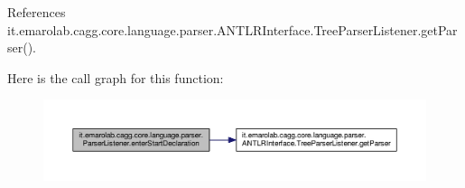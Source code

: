 References it.\-emarolab.\-cagg.\-core.\-language.\-parser.\-A\-N\-T\-L\-R\-Interface.\-Tree\-Parser\-Listener.\-get\-Parser().



Here is the call graph for this function\-:\nopagebreak
\begin{figure}[H]
\begin{center}
\leavevmode
\includegraphics[width=350pt]{classit_1_1emarolab_1_1cagg_1_1core_1_1language_1_1parser_1_1ParserListener_aed842d8c9b5c5053785a4909b2156eb9_cgraph}
\end{center}
\end{figure}


